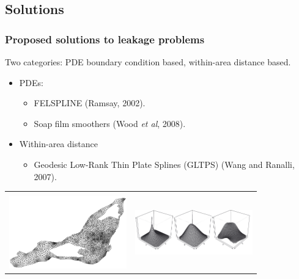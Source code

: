 \documentclass[ignorenonframetext]{beamer} %
\newcommand{\bc}{\begin{center}}
\newcommand{\ec}{\end{center}}
\newcommand{\bi}{\begin{itemize}}
\newcommand{\ei}{\end{itemize}}
\begin{document}

\subsection{Solutions}

\begin{frame}
	\frametitle{Proposed solutions to leakage problems}
	Two categories: PDE boundary condition based, within-area distance based.
       \bi
         \item PDEs:
	  \bi
             \item FELSPLINE (Ramsay, 2002).
             \item Soap film smoothers (Wood \emph{et al}, 2008).
           \ei
           \item Within-area distance
           \bi
             \item Geodesic Low-Rank  Thin Plate Splines (GLTPS) (Wang and Ranalli, 2007).
           \ei
        \ei
        \bc\begin{tabular}{@{}cc}
          & \\
        \includegraphics[width=2in]{figs/ramsaytriangulation.png}&\includegraphics[width=2in]{figs/soapbases.png}\\
        \end{tabular}
        \ec
\end{frame}

\end{document}
